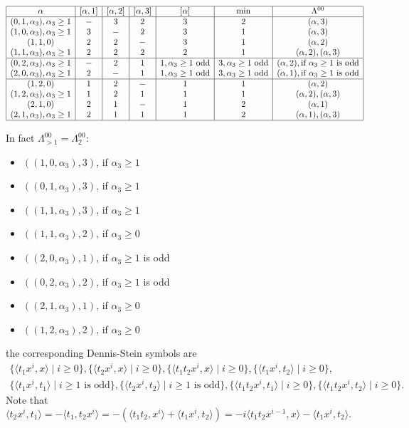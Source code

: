 \[\begin{array}{|c|c|c|c|c|c|c|}
\hline
\alpha & [\alpha,1] &[\alpha,2]&[\alpha, 3] &[\alpha] & \min & \Lambda^{00}  \\
\hline
(0,1,\alpha_3),\alpha_3\geq 1  & - & 3 & 2 &3 &2 &(\alpha,3) \\
(1,0,\alpha_3),\alpha_3\geq 1  & 3 & - & 2 &3 &1 &(\alpha,3) \\
(1,1,0)  & 2 & 2 & - &3 &1 &(\alpha,2) \\
(1,1,\alpha_3),\alpha_3\geq 1  & 2 & 2 & 2 &2 &1 &(\alpha,2),(\alpha,3) \\
\hline
(0,2,\alpha_3),\alpha_3\geq 1  & - & 2 & 1 &1,\alpha_3\geq 1 \text{ odd} &3,\alpha_3\geq 1 \text{ odd} &(\alpha,2), \text{if $\alpha_3\geq 1$ is odd} \\
(2,0,\alpha_3),\alpha_3\geq 1  & 2 & - & 1 &1,\alpha_3\geq 1 \text{ odd} &3,\alpha_3\geq 1 \text{ odd} &(\alpha,1), \text{if $\alpha_3\geq 1$ is odd}\\
\hline
(1,2,0)  & 1 & 2 & - &1 &1 &(\alpha,2) \\
(1,2,\alpha_3),\alpha_3\geq 1  & 1 & 2 & 1 &1 &1 &(\alpha,2),(\alpha,3) \\
(2,1,0)  & 2 & 1 & - &1 &2 &(\alpha,1) \\
(2,1,\alpha_3),\alpha_3\geq 1  & 2 & 1 & 1 &1 &2 &(\alpha,1),(\alpha,3) \\
\hline
\end{array}\]

In fact $\Lambda_{>1}^{00}=\Lambda_2^{00}:$
\begin{itemize}
	\item $((1,0,\alpha_3),3)$, if $\alpha_3\geq 1$
	\item $((0,1,\alpha_3),3)$, if $\alpha_3\geq 1$
	\item $((1,1,\alpha_3),3)$, if $\alpha_3\geq 1$
	\item $((1,1,\alpha_3),2)$, if $\alpha_3\geq 0$
	\item $((2,0,\alpha_3),1)$, if $\alpha_3\geq 1$ is odd
	\item $((0,2,\alpha_3),2)$, if $\alpha_3\geq 1$ is odd
	\item $((2,1,\alpha_3),1)$, if $\alpha_3\geq 0$
	\item $((1,2,\alpha_3),2)$, if $\alpha_3\geq 0$
\end{itemize}
the corresponding Dennis-Stein symbols are
\begin{gather*}
	\{\langle t_1x^i,x \rangle \mid i\geq 0\},\{\langle t_2x^i,x \rangle \mid i\geq 0\},\{\langle t_1t_2x^i,x \rangle \mid i\geq 0\},\{\langle t_1x^i,t_2 \rangle \mid i\geq 0\},\\
	\{\langle t_1x^i,t_1 \rangle \mid i\geq 1 \text{ is odd}\},\{\langle t_2x^i,t_2 \rangle \mid i\geq 1 \text{ is odd}\},\{\langle t_1t_2x^i,t_1 \rangle \mid i\geq 0\},\{\langle t_1t_2x^i,t_2 \rangle \mid i\geq 0\}.
\end{gather*}
Note that $\langle t_2x^i,t_1 \rangle=-\langle t_1,t_2x^i \rangle=-(\langle t_1t_2,x^i \rangle+\langle t_1x^i,t_2 \rangle)=-i\langle t_1t_2x^{i-1},x \rangle-\langle t_1x^i,t_2 \rangle.$

